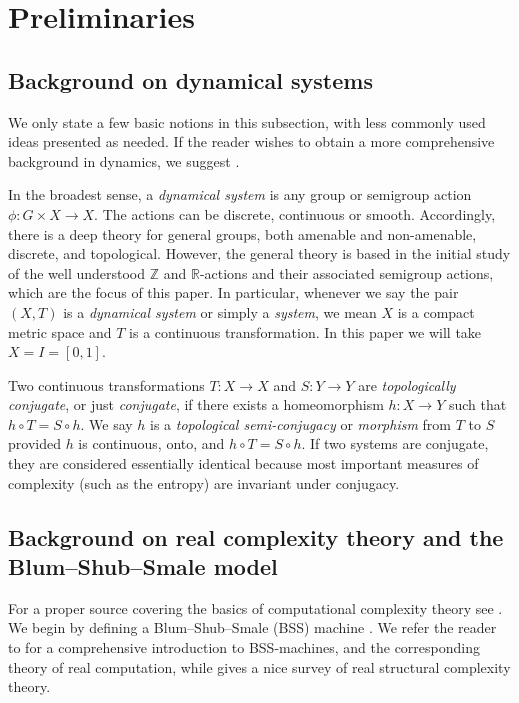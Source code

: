 \documentclass{amsart}
\theoremstyle{theorem}
\theoremstyle{remark}
\newcommand{\RR}{\mathbb{R}}
\newcommand{\ZZ}{\mathbb{Z}}
\begin{document}
\section{Preliminaries}\label{secPreliminaries}

\subsection{Background on dynamical systems}

We only state a few basic notions in this subsection, with less commonly used ideas presented as needed. If the reader wishes to obtain a more comprehensive background in dynamics, we suggest \cite{robinson1998dynamical,akin1993general}.

In the broadest sense, a \emph{dynamical system} is any group or semigroup action $\phi:G \times X \rightarrow X$. The actions can be discrete, continuous or smooth. Accordingly, there is a deep theory for general groups, both amenable and non-amenable, discrete, and topological. However, the general theory is based in the initial study of the well understood $\ZZ$ and $\RR$-actions and their associated semigroup actions, which are the focus of this paper.
In particular, whenever we say the pair $(X, T)$ is a \emph{dynamical system} or simply a \emph{system}, we mean $X$ is a compact metric space and $T$ is a continuous transformation. In this paper we will take $X = I= [0,1]$.

Two continuous transformations $T:X \rightarrow X$ and $S:Y \rightarrow Y$ are  \emph{topologically conjugate}, or just \emph{conjugate}, if there exists a homeomorphism $h:X \rightarrow Y$ such that $h\circ T = S \circ h$. We say $h$ is a \emph{topological semi-conjugacy} or \emph{morphism} from $T$ to $S$ provided $h$ is continuous, onto, and $h\circ T = S \circ h$.
If two systems are conjugate, they are considered essentially identical because most important measures of complexity (such as the entropy) are invariant under conjugacy.



\subsection{Background on real complexity theory and the Blum--Shub--Smale model}\label{secBSS}
For a proper source covering the basics of computational complexity theory see \cite{arora2009computational,papadimitriou}.
We begin by defining a Blum--Shub--Smale (BSS) machine \cite{blum1989theory}. We refer the reader to \cite{blum2012complexity} for a comprehensive introduction to BSS-machines, and the corresponding theory of real computation, while \cite{meer1997survey} gives a nice survey of real structural complexity theory.
\end{document}
